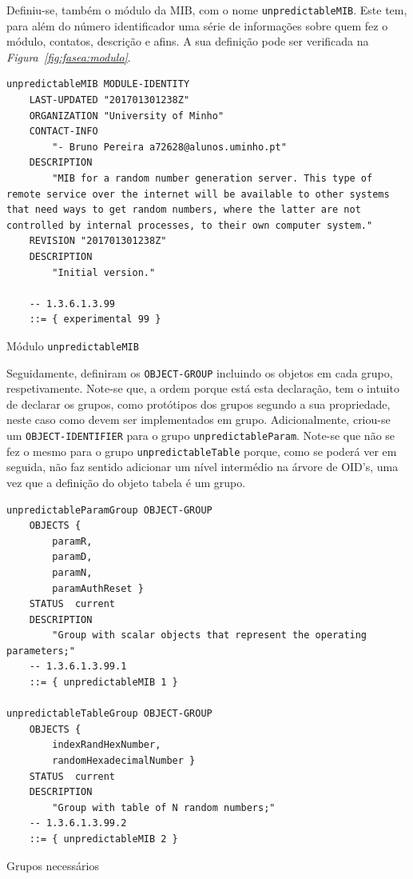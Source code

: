 Definiu-se, também o módulo da MIB, com o nome
\texttt{unpredictableMIB}. Este tem, para além do número identificador uma série
de informações sobre quem fez o módulo, contatos, descrição e afins. A sua
definição pode ser verificada na \emph{Figura~\ref{fig:fasea:modulo}}. 

\begin{center}
 	
\begin{verbatim}
unpredictableMIB MODULE-IDENTITY
	LAST-UPDATED "201701301238Z"
	ORGANIZATION "University of Minho"
	CONTACT-INFO
		"- Bruno Pereira a72628@alunos.uminho.pt"
	DESCRIPTION
		"MIB for a random number generation server. This type of remote service over the internet will be available to other systems that need ways to get random numbers, where the latter are not controlled by internal processes, to their own computer system."
	REVISION "201701301238Z"
	DESCRIPTION
		"Initial version."

	-- 1.3.6.1.3.99
	::= { experimental 99 }
\end{verbatim}
 	\captionsetup{type=figure, width=0.8\linewidth}
	\caption{Módulo \texttt{unpredictableMIB} }
\label{fig:fasea:modulo} 
\end{center}

\newpage

Seguidamente, definiram os \texttt{OBJECT-GROUP} incluindo os objetos em cada
grupo, respetivamente. Note-se que, a ordem porque está esta declaração, tem
o intuito de declarar os grupos, como protótipos dos grupos segundo a sua
propriedade, neste caso como devem ser implementados em grupo. Adicionalmente,
criou-se um \texttt{OBJECT-IDENTIFIER} para o grupo \texttt{unpredictableParam}.
Note-se que não se fez o mesmo para o grupo \texttt{unpredictableTable} porque,
como se poderá ver em seguida, não faz sentido adicionar um nível intermédio na
árvore de OID's, uma vez que a definição do objeto tabela é um grupo.

\begin{center}
 	
\begin{verbatim}
unpredictableParamGroup OBJECT-GROUP
	OBJECTS {
		paramR,
		paramD,
		paramN,
		paramAuthReset }
	STATUS  current
	DESCRIPTION
		"Group with scalar objects that represent the operating parameters;"
	-- 1.3.6.1.3.99.1
	::= { unpredictableMIB 1 }

unpredictableTableGroup OBJECT-GROUP
	OBJECTS {
		indexRandHexNumber,
		randomHexadecimalNumber }
	STATUS  current
	DESCRIPTION
		"Group with table of N random numbers;"
	-- 1.3.6.1.3.99.2
	::= { unpredictableMIB 2 }
\end{verbatim}
 	\captionsetup{type=figure, width=0.8\linewidth}
	\caption{Grupos necessários}
\label{fig:fasea:groups} 
\end{center}



